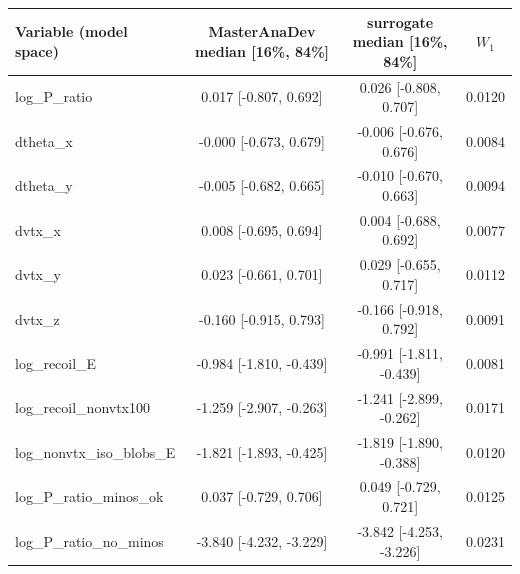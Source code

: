 \begin{tabular}{lccc}
\toprule
Variable (model space) & MasterAnaDev median [16\%, 84\%] & surrogate median [16\%, 84\%] & $W_1$ \\
\midrule
log\_P\_ratio & 0.017 [-0.807, 0.692] & 0.026 [-0.808, 0.707] & 0.0120 \\
dtheta\_x & -0.000 [-0.673, 0.679] & -0.006 [-0.676, 0.676] & 0.0084 \\
dtheta\_y & -0.005 [-0.682, 0.665] & -0.010 [-0.670, 0.663] & 0.0094 \\
dvtx\_x & 0.008 [-0.695, 0.694] & 0.004 [-0.688, 0.692] & 0.0077 \\
dvtx\_y & 0.023 [-0.661, 0.701] & 0.029 [-0.655, 0.717] & 0.0112 \\
dvtx\_z & -0.160 [-0.915, 0.793] & -0.166 [-0.918, 0.792] & 0.0091 \\
log\_recoil\_E & -0.984 [-1.810, -0.439] & -0.991 [-1.811, -0.439] & 0.0081 \\
log\_recoil\_nonvtx100 & -1.259 [-2.907, -0.263] & -1.241 [-2.899, -0.262] & 0.0171 \\
log\_nonvtx\_iso\_blobs\_E & -1.821 [-1.893, -0.425] & -1.819 [-1.890, -0.388] & 0.0120 \\
log\_P\_ratio\_minos\_ok & 0.037 [-0.729, 0.706] & 0.049 [-0.729, 0.721] & 0.0125 \\
log\_P\_ratio\_no\_minos & -3.840 [-4.232, -3.229] & -3.842 [-4.253, -3.226] & 0.0231 \\
\bottomrule
\end{tabular}
